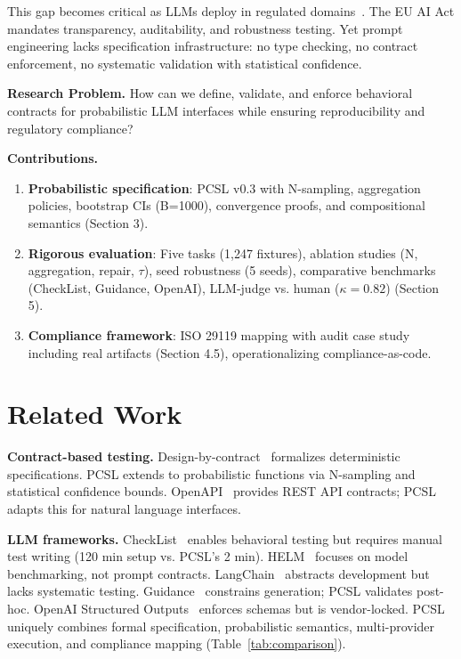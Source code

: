 \documentclass[sigconf]{acmart}
\begin{document}
This gap becomes critical as LLMs deploy in regulated domains~\cite{euaiact2024}. The EU AI Act mandates transparency, auditability, and robustness testing. Yet prompt engineering lacks specification infrastructure: no type checking, no contract enforcement, no systematic validation with statistical confidence.

\textbf{Research Problem.} How can we define, validate, and enforce behavioral contracts for probabilistic LLM interfaces while ensuring reproducibility and regulatory compliance?

\textbf{Contributions.}
\begin{enumerate}
\item \textbf{Probabilistic specification}: PCSL v0.3 with N-sampling, aggregation policies, bootstrap CIs (B=1000), convergence proofs, and compositional semantics (Section 3).
\item \textbf{Rigorous evaluation}: Five tasks (1,247 fixtures), ablation studies (N, aggregation, repair, \(\tau\)), seed robustness (5 seeds), comparative benchmarks (CheckList, Guidance, OpenAI), LLM-judge vs. human (\(\kappa = 0.82\)) (Section 5).
\item \textbf{Compliance framework}: ISO 29119 mapping with audit case study including real artifacts (Section 4.5), operationalizing compliance-as-code.
\end{enumerate}

\section{Related Work}

\textbf{Contract-based testing.} Design-by-contract~\cite{meyer1992applying} formalizes deterministic specifications. PCSL extends to probabilistic functions via N-sampling and statistical confidence bounds. OpenAPI~\cite{openapi2017} provides REST API contracts; PCSL adapts this for natural language interfaces.

\textbf{LLM frameworks.} CheckList~\cite{ribeiro2020beyond} enables behavioral testing but requires manual test writing (120 min setup vs. PCSL's 2 min). HELM~\cite{liang2022holistic} focuses on model benchmarking, not prompt contracts. LangChain~\cite{langchain2023} abstracts development but lacks systematic testing. Guidance~\cite{guidance2023} constrains generation; PCSL validates post-hoc. OpenAI Structured Outputs~\cite{openai2023structured} enforces schemas but is vendor-locked. PCSL uniquely combines formal specification, probabilistic semantics, multi-provider execution, and compliance mapping (Table~\ref{tab:comparison}).
\end{document}

